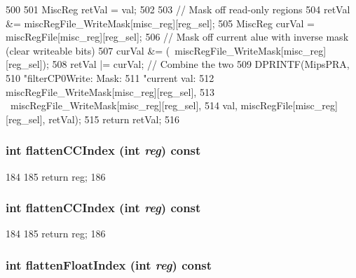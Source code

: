 \begin{DoxyCode}
500 {
501     MiscReg retVal = val;
502 
503     // Mask off read-only regions
504     retVal &= miscRegFile_WriteMask[misc_reg][reg_sel];
505     MiscReg curVal = miscRegFile[misc_reg][reg_sel];
506     // Mask off current alue with inverse mask (clear writeable bits)
507     curVal &= (~miscRegFile_WriteMask[misc_reg][reg_sel]);
508     retVal |= curVal; // Combine the two
509     DPRINTF(MipsPRA,
510             "filterCP0Write: Mask: %
511             "current val: %
512             miscRegFile_WriteMask[misc_reg][reg_sel],
513             ~miscRegFile_WriteMask[misc_reg][reg_sel],
514             val, miscRegFile[misc_reg][reg_sel], retVal);
515     return retVal;
516 }
\end{DoxyCode}
\hypertarget{classMipsISA_1_1ISA_a7a5d7476bd10e5af09e6e753d1fca087}{
\subsubsection[{flattenCCIndex}]{\setlength{\rightskip}{0pt plus 5cm}int flattenCCIndex (int {\em reg}) const}}
\label{classMipsISA_1_1ISA_a7a5d7476bd10e5af09e6e753d1fca087}



\begin{DoxyCode}
184         {
185             return reg;
186         }
\end{DoxyCode}
\hypertarget{classMipsISA_1_1ISA_a7a5d7476bd10e5af09e6e753d1fca087}{
\subsubsection[{flattenCCIndex}]{\setlength{\rightskip}{0pt plus 5cm}int flattenCCIndex (int {\em reg}) const}}
\label{classMipsISA_1_1ISA_a7a5d7476bd10e5af09e6e753d1fca087}



\begin{DoxyCode}
184         {
185             return reg;
186         }
\end{DoxyCode}
\hypertarget{classMipsISA_1_1ISA_a85addcd4f57c5a0ffa81805dcad1eeb7}{
\subsubsection[{flattenFloatIndex}]{\setlength{\rightskip}{0pt plus 5cm}int flattenFloatIndex (int {\em reg}) const}}
\label{classMipsISA_1_1ISA_a85addcd4f57c5a0ffa81805dcad1eeb7}



